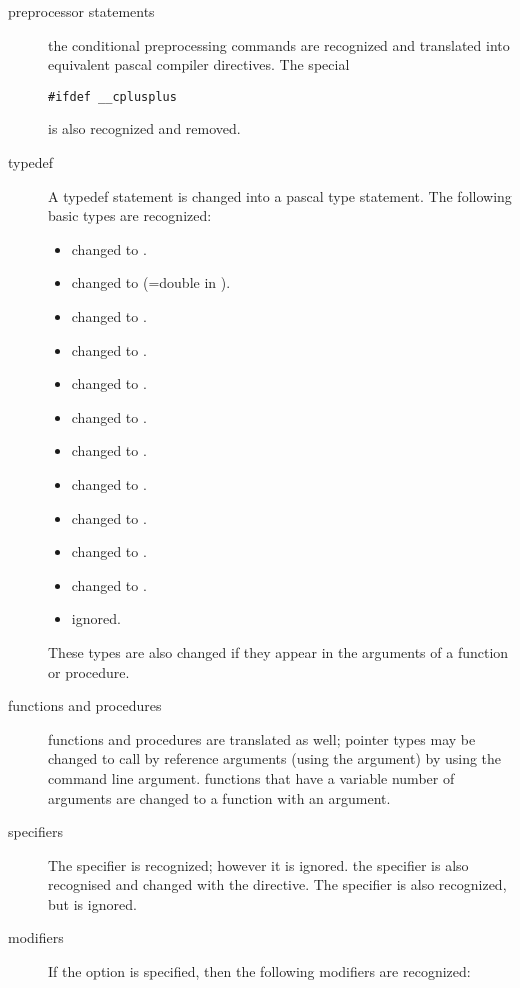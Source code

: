 \begin{description}
\item[preprocessor statements]
the conditional preprocessing commands are recognized and translated into
equivalent pascal compiler directives. The special 
\begin{verbatim}
#ifdef __cplusplus
\end{verbatim}
is also recognized and removed.
\item[typedef] A typedef statement is changed into a pascal type statement. 
The following basic types are recognized:
\begin{itemize}
\item {} changed to .
\item {} changed to  (=double in \fpc).
\item {} changed to .
\item {} changed to .
\item {} changed to .
\item {} changed to . 
\item {} changed to .
\item {} changed to .
\item {} changed to .
\item {} changed to .
\item {} changed to .
\item {} ignored.
\end{itemize}
These types are also changed if they appear in the arguments of a function
or procedure.
\item[functions and procedures]
functions and procedures are translated as well; pointer types may be
changed to call by reference arguments (using the  argument) 
by using the  command line argument. functions that have a 
variable number of arguments are changed to a function with an 
 argument.
\item[specifiers]
The  specifier is recognized; however it is ignored. the
 specifier is also recognised and changed with the
 directive. The  specifier is also 
recognized, but is ignored.
\item[modifiers] 
If the  option is specified, then the following modifiers are recognized:
\begin{verbatim}

\end{verbatim}
\end{description}

